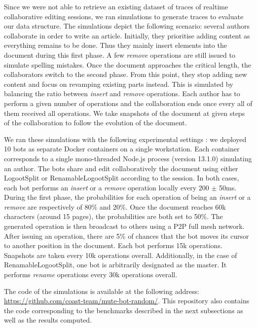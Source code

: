 \documentclass[sigplan,10pt]{acmart}
\begin{document}
Since we were not able to retrieve an existing dataset of traces of realtime collaborative editing sessions, we ran simulations to generate traces to evaluate our data structure.
The simulations depict the following scenario: several authors collaborate in order to write an article.
Initially, they prioritise adding content as everything remains to be done.
Thus they mainly insert elements into the document during this first phase.
A few \emph{remove} operations are still issued to simulate spelling mistakes.
Once the document approaches the critical length, the collaborators switch to the second phase.
From this point, they stop adding new content and focus on revamping existing parts instead.
This is simulated by balancing the ratio between \emph{insert} and \emph{remove} operations.
Each author has to perform a given number of operations and the collaboration ends once every all of them received all operations.
We take snapshots of the document at given steps of the collaboration to follow the evolution of the document.

We ran these simulations with the following experimental settings : we deployed 10 bots as separate Docker containers on a single workstation.
Each container corresponds to a single mono-threaded Node.js process (version 13.1.0) simulating an author.
The bots share and edit collaboratively the document using either LogootSplit or RenamableLogootSplit according to the session.
In both cases, each bot performs an \emph{insert} or a \emph{remove} operation locally every 200 $\pm$ 50ms.
During the first phase, the probabilities for each operation of being an \emph{insert} or a \emph{remove} are respectively of 80\% and 20\%.
Once the document reaches 60k characters (around 15 pages), the probabilities are both set to 50\%.
The generated operation is then broadcast to others using a \ac{P2P} full mesh network.
After issuing an operation, there are 5\% of chances that the bot moves its cursor to another position in the document.
Each bot performs 15k operations.
Snapshots are taken every 10k operations overall.
Additionally, in the case of RenamableLogootSplit, one bot is arbitrarily designated as the master.
It performs \emph{rename} operations every 30k operations overall.

The code of the simulations is available at the following address: \url{https://github.com/coast-team/mute-bot-random/}.
This repository also contains the code corresponding to the benchmarks described in the next subsections as well as the results computed.
\end{document}
